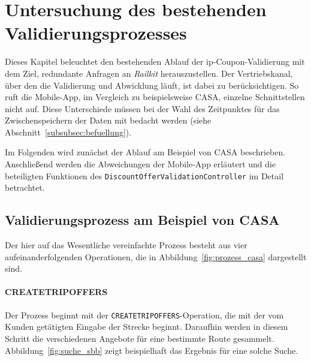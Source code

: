 \section{Untersuchung des bestehenden Validierungsprozesses}
\label{sec:untersuchung}

Dieses Kapitel beleuchtet den bestehenden Ablauf der \ac{ip}-Coupon-Validierung mit dem Ziel, redundante Anfragen an \textit{Railkit} herauszustellen. Der Vertriebskanal, über den die Validierung und Abwicklung läuft, ist dabei zu berücksichtigen. So ruft die Mobile-App, im Vergleich zu beispielsweise CASA, einzelne Schnittstellen nicht auf. Diese Unterschiede müssen bei der Wahl des Zeitpunktes für das Zwischenspeichern der Daten mit bedacht werden (siehe Abschnitt~\ref{subsubsec:befuellung}).

Im Folgenden wird zunächst der Ablauf am Beispiel von CASA beschrieben. Anschließend werden die Abweichungen der Mobile-App erläutert und die beteiligten Funktionen des \texttt{DiscountOfferValidationController} im Detail betrachtet.

\subsection{Validierungsprozess am Beispiel von CASA}
\label{subsec:prozess_casa}

Der hier auf das Wesentliche vereinfachte Prozess besteht aus vier aufeinanderfolgenden Operationen, die in Abbildung~\ref{fig:prozess_casa} dargestellt sind. %


\paragraph{CREATETRIPOFFERS}

Der Prozess beginnt mit der \texttt{CREATETRIPOFFERS}-Operation, die mit der vom Kunden getätigten Eingabe der Strecke beginnt. Daraufhin werden in diesem Schritt die verschiedenen Angebote für eine bestimmte Route gesammelt. Abbildung~\ref{fig:suche_sbb} zeigt beispielhaft das Ergebnis für eine solche Suche. %

